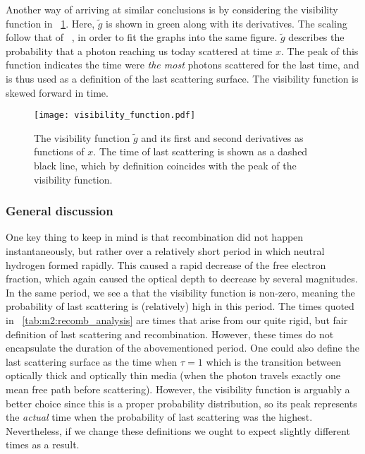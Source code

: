     Another way of arriving at similar conclusions is by considering the visibility function in ~\cref{fig:m2:visibility_function}. Here, $\tilde{g}$ is shown in green along with its derivatives. The scaling follow that of ~\cite{https://doi.org/10.48550/arxiv.astro-ph/0606683}, in order to fit the graphs into the same figure. $\tilde{g}$ describes the probability that a photon reaching us today scattered at time $x$. The peak of this function indicates the time were \textit{the most} photons scattered for the last time, and is thus used as a definition of the last scattering surface. The visibility function is skewed forward in time.
    \begin{figure}
        \texttt{[image: visibility\_function.pdf]}
        \caption{The visibility function $\tilde{g}$ and its first and second derivatives as functions of $x$. The time of last scattering is shown as a dashed black line, which by definition coincides with the peak of the visibility function.}
        \label{fig:m2:visibility_function}
    \end{figure}

    \subsubsection{General discussion}
    One key thing to keep in mind is that recombination did not happen instantaneously, but rather over a relatively short period in which neutral hydrogen formed rapidly. This caused a rapid decrease of the free electron fraction, which again caused the optical depth to decrease by several magnitudes. In the same period, we see a that the visibility function is non-zero, meaning the probability of last scattering is (relatively) high in this period. The times quoted in ~\cref{tab:m2:recomb_analysis} are times that arise from our quite rigid, but fair definition of last scattering and recombination. However, these times do not encapsulate the duration of the abovementioned period.  One could also define the last scattering surface as the time when $\tau=1$ which is the transition between optically thick and optically thin media (when the photon travels exactly one mean free path before scattering). However, the visibility function is arguably a better choice since this is a proper probability distribution, so its peak represents the \textit{actual} time when the probability of last scattering was the highest. Nevertheless, if we change these definitions we ought to expect slightly different times as a result.

